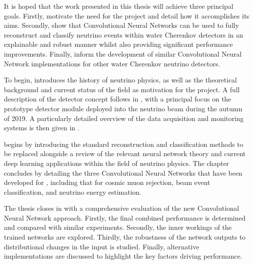 It is hoped that the work presented in this thesis will achieve three principal goals. Firstly,
motivate the need for the \chips project and detail how it accomplishes its aims. Secondly, show
that Convolutional Neural Networks can be used to fully reconstruct and classify neutrino events
within water Cherenkov detectors in an explainable and robust manner whilst also providing
significant performance improvements. Finally, inform the development of similar Convolutional
Neural Network implementations for other water Cherenkov neutrino detectors.

To begin,  introduces the history of neutrino physics, as well as the
theoretical background and current status of the field as motivation for the \chips project. A
full description of the \chips detector concept follows in , with a
principal focus on the \chipsfive prototype detector module deployed into the \numi neutrino beam
during the autumn of 2019. A particularly detailed overview of the \chipsfive data acquisition and
monitoring systems is then given in .

 begins by introducing the standard reconstruction and classification methods
to be replaced alongside a review of the relevant neural network theory and current deep learning
applications within the field of neutrino physics. The chapter concludes by detailing the three
Convolutional Neural Networks that have been developed for \chipsfive, including that for cosmic
muon rejection, beam event classification, and neutrino energy estimation.

The thesis closes in  with a comprehensive evaluation of the new
Convolutional Neural Network approach. Firstly, the final combined performance is determined and
compared with similar experiments. Secondly, the inner workings of the trained networks are
explored. Thirdly, the robustness of the network outputs to distributional changes in the input is
studied. Finally, alternative implementations are discussed to highlight the key factors driving
performance.
